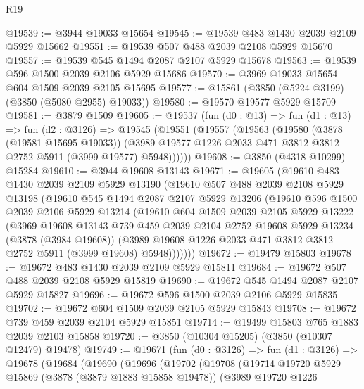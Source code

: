 \begin{lexlean}{R19}
\begin{coremodule}
@19539 := @3944 @19033 @15654
@19545 := @19539 @483 @1430 @2039 @2109 @5929 @15662
@19551 := @19539 @507 @488 @2039 @2108 @5929 @15670
@19557 := @19539 @545 @1494 @2087 @2107 @5929 @15678
@19563 := @19539 @596 @1500 @2039 @2106 @5929 @15686
@19570 := @3969 @19033 @15654 @604 @1509 @2039 @2105 @15695
@19577 := @15861 (@3850 (@5224 @3199) (@3850 (@5080 @2955) @19033))
@19580 := @19570 @19577 @5929 @15709
@19581 := @3879 @1509
@19605 := @19537
    (fun (d0 : @13) =>
    fun (d1 : @13) =>
    fun (d2 : @3126) =>
    @19545
      (@19551
        (@19557
          (@19563
            (@19580
              (@3878 (@19581 @15695 @19033))
              (@3989 @19577 @1226 @2033 @471 @3812 @3812 @2752 @5911 (@3999 @19577) @5948))))))
@19608 := @3850 (@4318 @10299) @15284
@19610 := @3944 @19608 @13143
@19671 := @19605
    (@19610
      @483
      @1430
      @2039
      @2109
      @5929
      @13190
      (@19610
        @507
        @488
        @2039
        @2108
        @5929
        @13198
        (@19610
          @545
          @1494
          @2087
          @2107
          @5929
          @13206
          (@19610
            @596
            @1500
            @2039
            @2106
            @5929
            @13214
            (@19610
              @604
              @1509
              @2039
              @2105
              @5929
              @13222
              (@3969
                @19608
                @13143
                @739
                @459
                @2039
                @2104
                @2752
                @19608
                @5929
                @13234
                (@3878 (@3984 @19608))
                (@3989 @19608 @1226 @2033 @471 @3812 @3812 @2752 @5911 (@3999 @19608) @5948)))))))
@19672 := @19479 @15803
@19678 := @19672 @483 @1430 @2039 @2109 @5929 @15811
@19684 := @19672 @507 @488 @2039 @2108 @5929 @15819
@19690 := @19672 @545 @1494 @2087 @2107 @5929 @15827
@19696 := @19672 @596 @1500 @2039 @2106 @5929 @15835
@19702 := @19672 @604 @1509 @2039 @2105 @5929 @15843
@19708 := @19672 @739 @459 @2039 @2104 @5929 @15851
@19714 := @19499 @15803 @765 @1883 @2039 @2103 @15858
@19720 := @3850 (@10304 @15205) (@3850 (@10307 @12479) @19478)
@19749 := @19671
    (fun (d0 : @3126) =>
    fun (d1 : @3126) =>
    @19678
      (@19684
        (@19690
          (@19696
            (@19702
              (@19708
                (@19714
                  @19720
                  @5929
                  @15869
                  (@3878 (@3879 @1883 @15858 @19478))
                  (@3989
                    @19720
                    @1226

\end{coremodule}
\end{lexlean}
